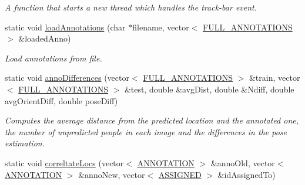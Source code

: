 \begin{DoxyCompactItemize}
\begin{DoxyCompactList}\small\item\em A function that starts a new thread which handles the track-\/bar event. \item\end{DoxyCompactList}\item 
\hypertarget{classannotationsHandle_a85794f6ce173c1109237e357b85fb884}{
static void \hyperlink{classannotationsHandle_a85794f6ce173c1109237e357b85fb884}{loadAnnotations} (char $\ast$filename, vector$<$ \hyperlink{structannotationsHandle_1_1FULL__ANNOTATIONS}{FULL\_\-ANNOTATIONS} $>$ \&loadedAnno)}
\label{classannotationsHandle_a85794f6ce173c1109237e357b85fb884}

\begin{DoxyCompactList}\small\item\em Load annotations from file. \item\end{DoxyCompactList}\item 
\hypertarget{classannotationsHandle_a04cf8b0e62ecb0b9f4556e489f126195}{
static void \hyperlink{classannotationsHandle_a04cf8b0e62ecb0b9f4556e489f126195}{annoDifferences} (vector$<$ \hyperlink{structannotationsHandle_1_1FULL__ANNOTATIONS}{FULL\_\-ANNOTATIONS} $>$ \&train, vector$<$ \hyperlink{structannotationsHandle_1_1FULL__ANNOTATIONS}{FULL\_\-ANNOTATIONS} $>$ \&test, double \&avgDist, double \&Ndiff, double avgOrientDiff, double poseDiff)}
\label{classannotationsHandle_a04cf8b0e62ecb0b9f4556e489f126195}

\begin{DoxyCompactList}\small\item\em Computes the average distance from the predicted location and the annotated one, the number of unpredicted people in each image and the differences in the pose estimation. \item\end{DoxyCompactList}\item 
\hypertarget{classannotationsHandle_aa710024aca2550b64d0c76020888c6ab}{
static void \hyperlink{classannotationsHandle_aa710024aca2550b64d0c76020888c6ab}{correltateLocs} (vector$<$ \hyperlink{structannotationsHandle_1_1ANNOTATION}{ANNOTATION} $>$ \&annoOld, vector$<$ \hyperlink{structannotationsHandle_1_1ANNOTATION}{ANNOTATION} $>$ \&annoNew, vector$<$ \hyperlink{structannotationsHandle_1_1ASSIGNED}{ASSIGNED} $>$ \&idAssignedTo)}
\label{classannotationsHandle_aa710024aca2550b64d0c76020888c6ab}


\end{DoxyCompactItemize}

